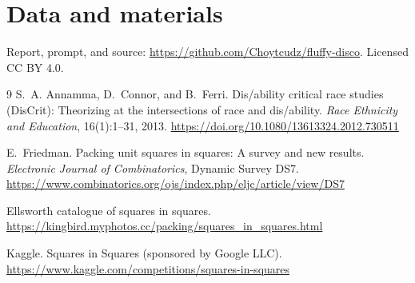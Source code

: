 \documentclass[11pt]{article}
\begin{document}
\section*{Data and materials}
Report, prompt, and source: \url{https://github.com/Choytcudz/fluffy-disco}.
Licensed CC BY 4.0.

\begin{thebibliography}{9}
S.~A. Annamma, D.~Connor, and B.~Ferri.
Dis/ability critical race studies (DisCrit): Theorizing at the
intersections of race and dis/ability.
\emph{Race Ethnicity and Education}, 16(1):1--31, 2013.
\url{https://doi.org/10.1080/13613324.2012.730511}

E.~Friedman.
Packing unit squares in squares: A survey and new results.
\emph{Electronic Journal of Combinatorics}, Dynamic Survey DS7.
\url{https://www.combinatorics.org/ojs/index.php/eljc/article/view/DS7}

Ellsworth catalogue of squares in squares.
\url{https://kingbird.myphotos.cc/packing/squares_in_squares.html}

Kaggle. Squares in Squares (sponsored by Google LLC).
\url{https://www.kaggle.com/competitions/squares-in-squares}
\end{thebibliography}
\end{document}
